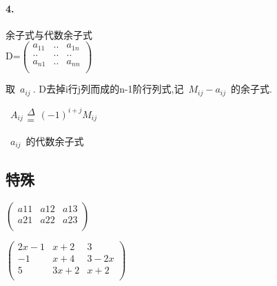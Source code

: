 \documentclass[printbox]{BHCexam}
\begin{document}
\paragraph{4.}余子式与代数余子式\\

D=$\left(                 %
\begin{array}{ccc}   %
  a_{11} & .. & a_{1n} \\  %
  .. & .. & ..\\  %
  a_{n1} & .. & a_{nn}\\ 
\end{array}
\right)$                 %

取~$a_{ij}~$. D去掉i行j列而成的n-1阶行列式,记~$M_{ij}-a_{ij}$~的余子式.\\
\centerline{~$A_{ij}　\substack{\Delta \\=} (-1)^{i+j}M_{ij}$~}
\centerline{~$a_{ij}$~的代数余子式}





\subsection{特殊}


   
   $\left(                 %
   \begin{array}{ccc}   %
     a11 & a12 & a13\\  %
     a21 & a22 & a23\\  %
   \end{array}
 \right)$      

  
   


      $\left(                 %
        \begin{array}{ccc}   %
          2x-1 & x+2 & 3\\  %
          -1 & x+4 & 3-2x\\  %
          5 & 3x+2 & x+2\\ 
        \end{array}
      \right)$                 %
\end{document}
